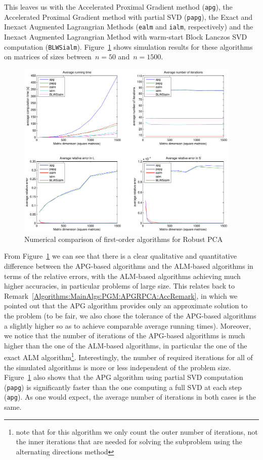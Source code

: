 This leaves us with the Accelerated Proximal Gradient method (\texttt{apg}), the Accelerated Proximal Gradient method with partial SVD (\texttt{papg}), the Exact and Inexact Augmented Lagrangrian Methods (\texttt{ealm} and \texttt{ialm}, respectively) and the Inexact Augmented Lagrangrian Method with warm-start Block Lanczos SVD computation (\texttt{BLWSialm}). Figure~\ref{Algorithms:Discussion:NumComp:ALG:figure} shows simulation results for these algorithms on matrices of sizes between~$n=50$ and~$n=1500$.
%
\begin{figure}[h]
\centering
\includegraphics[width=0.95\textwidth]{../figures/ALG_comparison}
\caption{Numerical comparison of first-order algorithms for Robust PCA}
\label{Algorithms:Discussion:NumComp:ALG:figure}
\end{figure}
%

From Figure~\ref{Algorithms:Discussion:NumComp:ALG:figure} we can see that there is a clear qualitative and quantitative difference between the APG-based algorithms and the ALM-based algorithms in terms of the relative errors, with the ALM-based algorithms achieving much higher accuracies, in particular problems of large size. This relates back to Remark~\ref{Algorithms:MainAlgs:PGM:APGRPCA:AccRemark}, in which we pointed out that the APG algorithm provides only an approximate solution to the problem (to be fair, we also chose the tolerance of the APG-based algorithms a slightly higher so as to achieve comparable average running times). Moreover, we notice that the number of iterations of the APG-based algorithms is much higher than the one of the ALM-based algorithms, in particular the one of the exact ALM algorithm\footnote{note that for this algorithm we only count the outer number of iterations, not the inner iterations that are needed for solving the subproblem using the alternating directions method}. Interestingly, the number of required iterations for all of the simulated algorithms is more or less independent of the problem size. Figure~\ref{Algorithms:Discussion:NumComp:ALG:figure} also shows that the APG algorithm using partial SVD computation (\texttt{papg}) is significantly faster than the one computing a full SVD at each step (\texttt{apg}). As one would expect, the average number of iterations in both cases is the same. 


